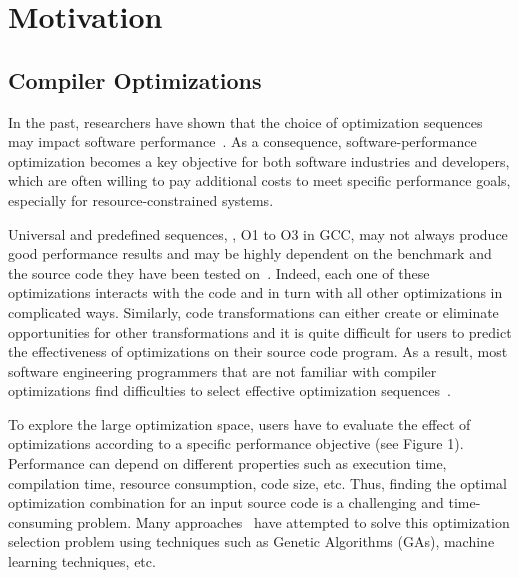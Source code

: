 \section{Motivation}
\subsection{Compiler Optimizations}
In the past, researchers have shown that the choice of optimization sequences may impact software performance~\cite{almagor2004finding,chen2012deconstructing}. 
As a consequence, software-performance optimization becomes a key objective for both software industries and developers, which are often willing to pay additional costs to meet specific performance goals, especially for resource-constrained systems.

Universal and predefined sequences, \eg, O1 to O3 in GCC, may not always produce good performance results and may be highly dependent on the benchmark and the source code they have been tested on~\cite{hoste2008cole,chen2010evaluating,escobar2015evaluation}.
Indeed, each one of these optimizations interacts with the code and in turn with all other optimizations in complicated ways. Similarly, code transformations can either create or eliminate opportunities for other transformations and it is quite difficult for users to predict the effectiveness of optimizations on their source code program.
As a result, most software engineering programmers that are not familiar with compiler optimizations find difficulties to select effective optimization sequences~\cite{almagor2004finding}.

To explore the large optimization space, users have to evaluate the effect of optimizations according to a specific performance objective (see Figure 1). Performance can depend on different properties such as execution time, compilation time, resource consumption, code size, etc.
Thus, finding the optimal optimization combination for an input source code is a challenging and time-consuming problem. 
Many approaches~\cite{hoste2008cole,zhong2009tuning,sandran2012genetic,martins2014exploration} have attempted to solve this optimization selection problem using techniques such as Genetic Algorithms (GAs), machine learning techniques, etc.

